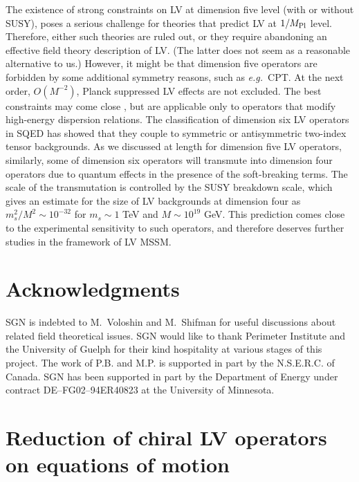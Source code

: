 \documentclass[12pt]{revtex4}
\begin{document}
The existence of strong constraints on LV at dimension five level
(with or without SUSY), poses a serious challenge for theories that
predict LV at $1/M_{\rm Pl}$ level. Therefore, either such theories are
ruled out, or they require abandoning an effective field theory
description of LV. (The latter does not seem as a reasonable alternative
to us.) However, it might be that dimension five operators are
forbidden by some additional symmetry reasons, such as {\em e.g.}\
CPT. At the next order, $O(M^{-2})$, Planck suppressed LV effects 
are not excluded. The best constraints may come close
\cite{Gagnon:2004xh},  but are applicable only to operators that
modify high-energy dispersion relations. The classification of
dimension six LV operators in SQED has showed that they  couple to
symmetric or antisymmetric two-index tensor backgrounds. 
As we discussed at length for dimension five LV operators, similarly,  some
of dimension six operators will transmute into dimension four operators
due to quantum effects in the presence of the soft-breaking
terms. The scale of the transmutation is controlled by the
SUSY breakdown scale, which gives an estimate for the size of  
LV backgrounds at dimension four as $m_s^2/M^2 \sim 10^{-32}$
for $m_s\sim1$ TeV and $M\sim 10^{19}$ GeV. This prediction 
comes close to the experimental sensitivity to such operators,
and therefore deserves further studies in the framework of LV MSSM. 



\section*{Acknowledgments}


SGN is indebted to M.\ Voloshin and M.\ Shifman for useful discussions
about related field theoretical issues. 
SGN would like to thank Perimeter Institute and the University of
Guelph for their kind hospitality at various stages of this project. 
The work of P.B. and M.P. is supported in part by the N.S.E.R.C. of Canada. SGN has been supported in part by the Department of Energy 
under contract DE--FG02--94ER40823 at the University of Minnesota.



\pagebreak
\appendix



\section{Reduction of chiral LV operators on equations of motion}
\label{app_reduction}
\end{document}
